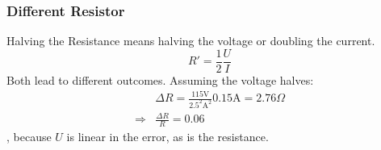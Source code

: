\subsubsection{Different Resistor}
Halving the Resistance means halving the voltage or doubling the current.
\begin{equation}
    R' = \frac{1}{2}\frac{U}{I}
\end{equation}
Both lead to different outcomes. Assuming the voltage halves:
\begin{align}
    &\Delta R = \frac{115\text{V}}{2.5^2\text{A}^2}0.15\text{A}=2.76\Omega
    \\\Rightarrow &\frac{\Delta R}{R}=0.06
\end{align}
, because $U$ is linear in the error, as is the resistance.
